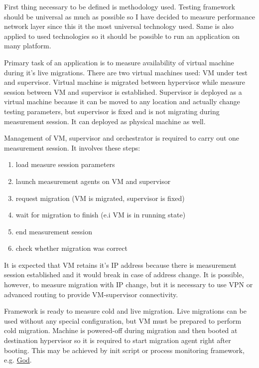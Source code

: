 
First thing necessary to be defined is methodology used. Testing framework should be universal as much as possible so I have decided to measure performance network layer since this it the most universal technology used. Same is also applied to used technologies so it should be possible to run an application on many platform. 

Primary task of an application is to measure availability of virtual machine during it's live migrations. There are two virtual machines used: \Ac{VM} under test and supervisor. Virtual machine is migrated between hypervisor while measure session between \Ac{VM} and supervisor is established. Supervisor is deployed as a virtual machine because it can be moved to any location and actually change testing parameters, but supervisor is fixed and is not migrating during measurement session. It can deployed as physical machine as well.

Management of \Ac{VM}, supervisor and orchestrator is required to carry out one measurement session. It involves these steps:
\begin{enumerate}
	\item load measure session parameters
	\item launch measurement agents on \Ac{VM} and supervisor
	\item request migration (\Ac{VM} is migrated, supervisor is fixed)
	\item wait for migration to finish (e.i \Ac{VM} is in running state)
	\item end measurement session
	\item check whether migration was correct
\end{enumerate}

It is expected that \Ac{VM} retains it's \Ac{IP} address because there is measurement session established and it would break in case of address change. It is possible, however, to measure migration with \Ac{IP} change, but it is necessary to use \Ac{VPN} or advanced routing to provide \Ac{VM}-supervisor connectivity.

Framework is ready to measure cold and live migration. Live migrations can be used without any special configuration, but \Ac{VM} must be prepared to perform cold migration. Machine is powered-off during migration and then booted at destination hypervisor so it is required to start migration agent right after booting. This may be achieved by init script or process monitoring framework, e.g. \href{http://godrb.com/}{God}.

